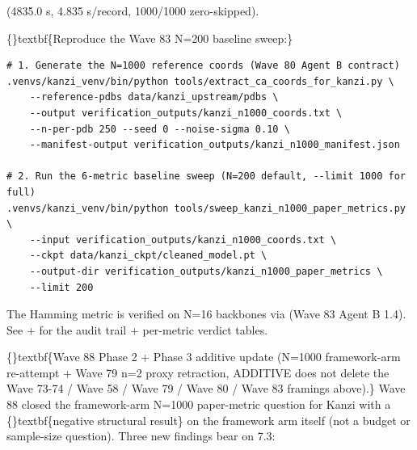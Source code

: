 \documentclass{article}
\begin{document}
 (4835.0 s, 4.835 s/record, 1000/1000 zero-skipped).

\{\}textbf\{Reproduce the Wave 83 N=200 baseline sweep:\}

\begin{verbatim}
# 1. Generate the N=1000 reference coords (Wave 80 Agent B contract)
.venvs/kanzi_venv/bin/python tools/extract_ca_coords_for_kanzi.py \
    --reference-pdbs data/kanzi_upstream/pdbs \
    --output verification_outputs/kanzi_n1000_coords.txt \
    --n-per-pdb 250 --seed 0 --noise-sigma 0.10 \
    --manifest-output verification_outputs/kanzi_n1000_manifest.json

# 2. Run the 6-metric baseline sweep (N=200 default, --limit 1000 for full)
.venvs/kanzi_venv/bin/python tools/sweep_kanzi_n1000_paper_metrics.py \
    --input verification_outputs/kanzi_n1000_coords.txt \
    --ckpt data/kanzi_ckpt/cleaned_model.pt \
    --output-dir verification_outputs/kanzi_n1000_paper_metrics \
    --limit 200
\end{verbatim}
The Hamming metric is verified on N=16 backbones via  (Wave 83 Agent B 1.4). See  +  for the audit trail + per-metric verdict tables.

\{\}textbf\{Wave 88 Phase 2 + Phase 3 additive update (N=1000 framework-arm re-attempt + Wave 79 n=2 proxy retraction, ADDITIVE  does not delete the Wave 73-74 / Wave 58 / Wave 79 / Wave 80 / Wave 83 framings above).\} Wave 88 closed the framework-arm N=1000 paper-metric question for Kanzi with a \{\}textbf\{negative structural result\} on the framework arm itself (not a budget or sample-size question). Three new findings bear on 7.3:
\end{document}
